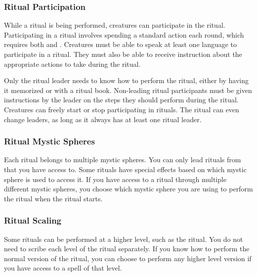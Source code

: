     \subsubsection{Ritual Participation}
      While a ritual is being performed, creatures can participate in the ritual.
      Participating in a ritual involves spending a standard action each round, which requires both  and .
      Creatures must be able to speak at least one language to participate in a ritual.
      They must also be able to receive instruction about the appropriate actions to take during the ritual.

      Only the ritual leader needs to know how to perform the ritual, either by having it memorized or with a ritual book.
      Non-leading ritual participants must be given instructions by the leader on the steps they should perform during the ritual.
      Creatures can freely start or stop participating in rituals.
      The ritual can even change leaders, as long as it always has at least one ritual leader.

    \subsubsection{Ritual Mystic Spheres}
      Each ritual belongs to multiple mystic spheres.
      You can only lead rituals from  that you have access to.
      Some rituals have special effects based on which mystic sphere is used to access it.
      If you have access to a ritual through multiple different mystic spheres, you choose which mystic sphere you are using to perform the ritual when the ritual starts.

    \subsubsection{Ritual Scaling}
      Some rituals can be performed at a higher level, such as the  ritual.
      You do not need to scribe each level of the ritual separately.
      If you know how to perform the normal version of the ritual, you can choose to perform any higher level version if you have access to a spell of that level.


